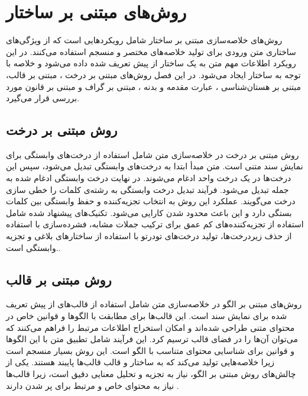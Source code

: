 \chapter{روش‌های مبتنی بر ساختار}

روش‌های خلاصه‌سازی مبتنی بر ساختار شامل رویکردهایی است که از ویژگی‌های ساختاری متن ورودی برای تولید خلاصه‌های مختصر و منسجم استفاده می‌کنند. در این رویکرد اطلاعات مهم متن به یک ساختار از پیش تعریف شده داده می‌شود و خلاصه با توجه به ساختار ایجاد می‌شود. در این فصل روش‌های مبتنی بر درخت 
، مبتنی بر قالب،
 مبتنی بر هستان‌شناسی
، عبارت مقدمه و بدنه
، مبتنی بر گراف
و مبتنی بر قانون
 مورد بررسی قرار می‌گیرد. 
 
\section{روش مبتنی بر درخت}
روش مبتنی بر درخت در خلاصه‌سازی متن شامل استفاده از درخت‌های وابستگی برای نمایش سند متنی است. متن مبدأ ابتدا به درخت‌های وابستگی تبدیل می‌شود، سپس این درخت‌ها در یک درخت واحد ادغام می‌شوند. در نهایت درخت وابستگی ادغام شده به جمله‌ تبدیل می‌شود. فرآیند تبدیل درخت وابستگی به رشته‌ی کلمات را خطی سازی درخت می‌گویند. عملکرد این روش به انتخاب تجزیه‌کننده و حفظ وابستگی بین کلمات بستگی دارد و این باعث محدود شدن کارایی می‌شود. تکنیک‌های پیشنهاد شده شامل استفاده از تجزیه‌کننده‌های کم عمق برای ترکیب جملات مشابه، فشرده‌سازی با استفاده از حذف زیردرخت‌ها، تولید درخت‌های تودرتو با استفاده از ساختارهای بلاغی و تجزیه وابستگی است.\cite{andhale2016overview}.

\section{روش مبتنی بر قالب}
روش‌های مبتنی بر الگو در خلاصه‌سازی متن شامل استفاده از قالب‌های از پیش تعریف شده برای نمایش سند است. این قالب‌ها برای مطابقت با الگوها و قوانین خاص در محتوای متنی طراحی شده‌اند و امکان استخراج اطلاعات مرتبط را فراهم می‌کنند که می‌توان آن‌ها را در فضای قالب ترسیم کرد. این فرآیند شامل تطبیق متن با این الگوها و قوانین برای شناسایی محتوای متناسب با الگو است. این روش بسیار منسجم است زیرا خلاصه‌هایی تولید می‌کند که به ساختار و قالب قالب‌ها پایبند هستند. یکی از چالش‌های روش‌ مبتنی بر الگو، نیاز به تجزیه و تحلیل معنایی دقیق است، زیرا قالب‌ها نیاز به محتوای خاص و مرتبط برای پر شدن دارند
\cite{andhale2016overview}.
